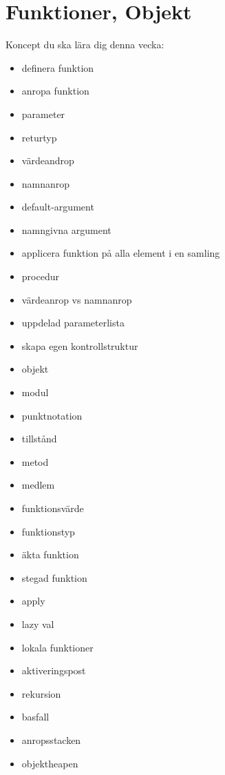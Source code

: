 \chapter{Funktioner, Objekt}\label{chapter:W03}
Koncept du ska lära dig denna vecka:
\begin{multicols}{2}\begin{itemize}[nosep,label={$\square$},leftmargin=*]
\item definera funktion
\item anropa funktion
\item parameter
\item returtyp
\item värdeandrop
\item namnanrop
\item default-argument
\item namngivna argument
\item applicera funktion på alla element i en samling
\item procedur
\item värdeanrop vs namnanrop
\item uppdelad parameterlista
\item skapa egen kontrollstruktur
\item objekt
\item modul
\item punktnotation
\item tillstånd
\item metod
\item medlem
\item funktionsvärde
\item funktionstyp
\item äkta funktion
\item stegad funktion
\item apply
\item lazy val
\item lokala funktioner
\item aktiveringspost
\item rekursion
\item basfall
\item anropsstacken
\item objektheapen\end{itemize}\end{multicols}
